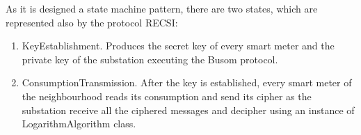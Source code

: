
As it is designed a state machine pattern, there are two states, which are represented also by the protocol RECSI:
\begin{enumerate}
	\item KeyEstablishment. Produces the secret key of every smart meter and the private key of the substation executing the Busom protocol.
	\item ConsumptionTransmission. After the key is established, every smart meter of the neighbourhood reads its consumption and send its cipher as the substation receive all the ciphered messages and decipher using an instance of LogarithmAlgorithm class.
\end{enumerate}
